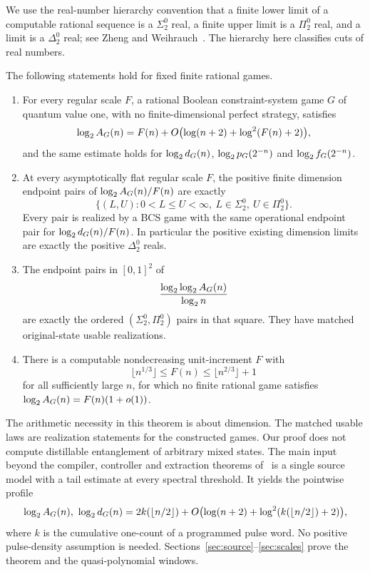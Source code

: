 We use the real-number hierarchy convention that a finite lower limit of a computable rational sequence is a $\Sigma^0_2$ real, a finite upper limit is a $\Pi^0_2$ real, and a limit is a $\Delta^0_2$ real; see Zheng and Weihrauch~\cite{ZW}. The hierarchy here classifies cuts of real numbers.

\begin{theorem}\label{thm:main}
The following statements hold for fixed finite rational games.
\begin{enumerate}
\item For every regular scale $F$, a rational Boolean constraint-system game $G$ of quantum value one, with no finite-dimensional perfect strategy, satisfies
\[
 \log_2 A_G(n)=F(n)+O\bigl(\log(n+2)+\log^2(F(n)+2)\bigr),
\]
and the same estimate holds for $\log_2 d_G(n)$, $\log_2 p_G(2^{-n})$ and $\log_2 f_G(2^{-n})$.
\item At every asymptotically flat regular scale $F$, the positive finite dimension endpoint pairs of $\log_2 A_G(n)/F(n)$ are exactly
\begin{equation}\label{eq:pairclass}
 \{(L,U):0<L\le U<\infty,\ L\in\Sigma^0_2,\ U\in\Pi^0_2\}.
\end{equation}
Every pair is realized by a BCS game with the same operational endpoint pair for $\log_2 d_G(n)/F(n)$. In particular the positive existing dimension limits are exactly the positive $\Delta^0_2$ reals.
\item The endpoint pairs in $[0,1]^2$ of
\[
 \frac{\log_2\log_2 A_G(n)}{\log_2 n}
\]
are exactly the ordered $(\Sigma^0_2,\Pi^0_2)$ pairs in that square. They have matched original-state usable realizations.
\item There is a computable nondecreasing unit-increment $F$ with
\[
 \lfloor n^{1/3}\rfloor\le F(n)\le\lfloor n^{2/3}\rfloor+1
\]
for all sufficiently large $n$, for which no finite rational game satisfies $\log_2 A_G(n)=F(n)(1+o(1))$.
\end{enumerate}
\end{theorem}

The arithmetic necessity in this theorem is about dimension. The matched usable laws are realization statements for the constructed games. Our proof does not compute distillable entanglement of arbitrary mixed states. The main input beyond the compiler, controller and extraction theorems of~\cite{UP,Precision} is a single source model with a tail estimate at every spectral threshold. It yields the pointwise profile
\[
 \log_2 A_G(n),\ \log_2 d_G(n)
 =2k(\lfloor n/2\rfloor)
 +O\bigl(\log(n+2)+\log^2(k(\lfloor n/2\rfloor)+2)\bigr),
\]
where $k$ is the cumulative one-count of a programmed pulse word. No positive pulse-density assumption is needed. Sections~\ref{sec:source}--\ref{sec:scales} prove the theorem and the quasi-polynomial windows.

